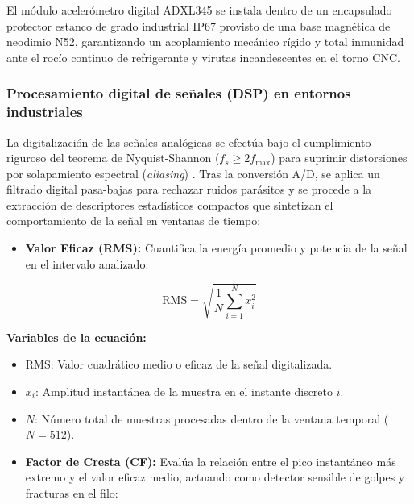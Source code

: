 El módulo acelerómetro digital ADXL345 se instala dentro de un encapsulado protector estanco de grado industrial IP67 provisto de una base magnética de neodimio N52, garantizando un acoplamiento mecánico rígido y total inmunidad ante el rocío continuo de refrigerante y virutas incandescentes en el torno CNC.

\subsubsection{Procesamiento digital de señales (DSP) en entornos industriales}

La digitalización de las señales analógicas se efectúa bajo el cumplimiento riguroso del teorema de Nyquist-Shannon ($f_s \ge 2 f_{\max}$) para suprimir distorsiones por solapamiento espectral (\textit{aliasing}) \citep{sevilla2011}. Tras la conversión A/D, se aplica un filtrado digital pasa-bajas para rechazar ruidos parásitos y se procede a la extracción de descriptores estadísticos compactos que sintetizan el comportamiento de la señal en ventanas de tiempo:

\begin{itemize}
    \item \textbf{Valor Eficaz (RMS):} Cuantifica la energía promedio y potencia de la señal en el intervalo analizado:
\end{itemize}

\begin{equation}
\text{RMS} = \sqrt{\frac{1}{N} \sum_{i=1}^{N} x_i^2}
\label{eq:rms}
\end{equation}

\noindent\textbf{Variables de la ecuación:}
\begin{itemize}
    \item $\text{RMS}$: Valor cuadrático medio o eficaz de la señal digitalizada.
    \item $x_i$: Amplitud instantánea de la muestra en el instante discreto $i$.
    \item $N$: Número total de muestras procesadas dentro de la ventana temporal ($N=512$).
\end{itemize}

\begin{itemize}
    \item \textbf{Factor de Cresta (CF):} Evalúa la relación entre el pico instantáneo más extremo y el valor eficaz medio, actuando como detector sensible de golpes y fracturas en el filo:
\end{itemize}

